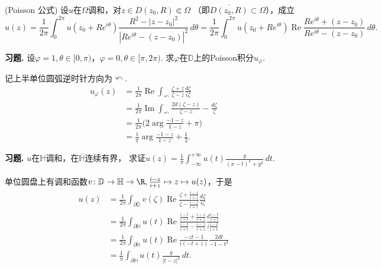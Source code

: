 \begin{proposition}(Poisson 公式) 设$u$在$\Omega$调和，对$z\in D(z_0,R)\Subset\Omega$
（即$\overline{D(z_0,R)}\subset\Omega$），成立
$$u(z)=\frac{1}{2\pi}\int_0^{2\pi}u(z_0+Re^{i\theta})
\frac{R^2-|z-z_0|^2}{|Re^{i\theta}-(z-z_0)|^2}\,d\theta
=\frac{1}{2\pi}\int_0^{2\pi}u(z_0+Re^{i\theta})\operatorname{Re}
\frac{Re^{i\theta}+(z-z_0)}{Re^{i\theta}-(z-z_0)}\,d\theta.$$
\end{proposition}

\textbf{习题. } 设$\varphi=1,\theta\in[0,\pi)$，$\varphi=0,\theta\in[\pi,2\pi)$.
求$\varphi$在$\mathbb{D}$上的Poisson积分$u_\varphi$.

\begin{proofc}记上半单位圆弧逆时针方向为$\curvearrowleft$.
    \begin{align*}
        u_\varphi(z)&=\frac{1}{2\pi}\operatorname{Re}\int_\curvearrowleft
    \frac{\zeta+z}{\zeta-z}\frac{d\zeta}{i\zeta}\\
    &=\frac{1}{2\pi}\operatorname{Im}\int_\curvearrowleft
    \frac{2d(\zeta-z)}{\zeta-z}-\frac{d\zeta}{\zeta}\\
    &=\frac{1}{2\pi}\Big(2\arg\frac{-1-z}{1-z}+\pi\Big)\\
    &=\frac{1}{\pi}\arg\frac{-1-z}{1-z}+\frac{1}{2}.
    \end{align*}
\end{proofc}

\textbf{习题. } $u$在$\mathbb{H}$调和，在$\overline{\mathbb{H}}$连续有界，
求证$\displaystyle{u(z)=\frac{1}{\pi}\int_{-\infty}^{+\infty}u(t)\frac{y}{(x-t)^2+y^2}\,dt}$.
\begin{proofc}
    单位圆盘上有调和函数$v\colon\mathbb{D}\rightarrow\mathbb{H}\rightarrow\R,\frac{i-z}{i+z}\mapsto z\mapsto u(z)$，于是
    \begin{align*}
        u(z)&=\frac{1}{2\pi}\int_{\partial\mathbb{D}}v(\zeta)\operatorname{Re}\frac{\zeta+\frac{i-z}{i+z}}{\zeta-\frac{i-z}{i+z}}\frac{d\zeta}{i\zeta}\\
        &=\frac{1}{2\pi}\int_{\partial\mathbb{H}}u(t)\operatorname{Re}\frac{\frac{i-t}{i+t}+\frac{i-z}{i+z}}{\frac{i-t}{i+t}-\frac{i-z}{i+z}}\frac{d\frac{i-t}{i+t}}{i\frac{i-t}{i+t}}\\
        &=\frac{1}{2\pi}\int_{\partial\mathbb{H}}u(t)\operatorname{Re}\frac{-zt-1}{i(-t+z)}\frac{2dt}{-1-t^2}\\
        &=\frac{1}{\pi}\int_{\partial\mathbb{H}}u(t)\frac{y}{|t-z|^2}\,dt.
    \end{align*}
\end{proofc}


